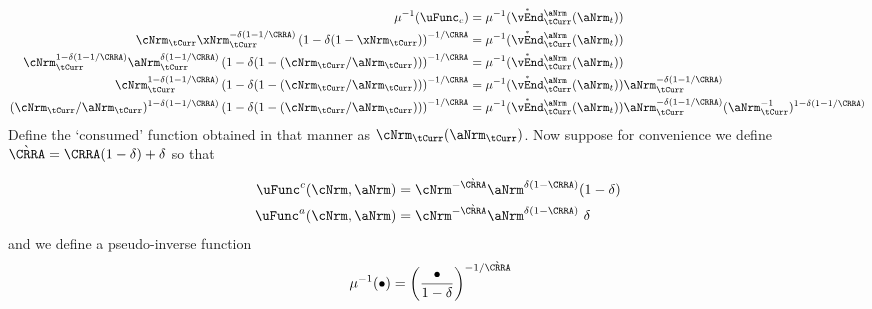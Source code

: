 \documentclass[./SolvingMicroDSOPs]{subfiles}
\begin{document}
{{				\begin{align}
					\muInv(\uFunc_{c}) & = \muInv(\Maxed{\vEnd}^{\aNrm}_{\tCurr}(\aNrm_{t}))
					\\ \cNrm_{\tCurr} \xNrm_{\tCurr}^{-\wealthU(1-1/\CRRA)} \left(1-\wealthU(1-\xNrm_{\tCurr})\right)^{-1/\CRRA} & = \muInv(\Maxed{\vEnd}^{\aNrm}_{\tCurr}(\aNrm_{t})) \notag
					\\ \cNrm_{\tCurr}^{1-\wealthU(1-1/\CRRA)} \aNrm_{\tCurr}^{\wealthU(1-1/\CRRA)} \left(1-\wealthU(1-(\cNrm_{\tCurr}/\aNrm_{\tCurr}))\right)^{-1/\CRRA} & = \muInv(\Maxed{\vEnd}^{\aNrm}_{\tCurr}(\aNrm_{t})) \notag
					\\ \cNrm_{\tCurr}^{1-\wealthU(1-1/\CRRA)}  \left(1-\wealthU(1-(\cNrm_{\tCurr}/\aNrm_{\tCurr}))\right)^{-1/\CRRA} & = \muInv(\Maxed{\vEnd}^{\aNrm}_{\tCurr}(\aNrm_{t})) \aNrm_{\tCurr}^{-\wealthU(1-1/\CRRA)} \notag 
					\\ (\cNrm_{\tCurr}/\aNrm_{\tCurr})^{1-\wealthU(1-1/\CRRA)}  \left(1-\wealthU(1-(\cNrm_{\tCurr}/\aNrm_{\tCurr}))\right)^{-1/\CRRA} & = \muInv(\Maxed{\vEnd}^{\aNrm}_{\tCurr}(\aNrm_{t})) \aNrm_{\tCurr}^{-\wealthU(1-1/\CRRA)}(\aNrm_{\tCurr}^{-1})^{1-\wealthU(1-1/\CRRA)} \notag
					\notag
				\end{align}
				Define the `consumed' function obtained in that manner as $\mathfrak{\cNrm}_{\tCurr}(\aNrm_{\tCurr})$.
			}{}
		} %
		{ %
		}
		Now suppose for convenience we define $\grave{\CRRA}=\CRRA(1-\wealthU)+\wealthU$ so that
		
		\begin{align}
			\uFunc^{c}(\cNrm,\aNrm) & = \cNrm^{-\grave{\CRRA}}\aNrm^{\wealthU(1-\CRRA)}(1- \wealthU)
			\\    \uFunc^{a}(\cNrm,\aNrm) & = \cNrm^{-\grave{\CRRA}}\aNrm^{\wealthU(1-\CRRA)}\phantom{~}\wealthU
		\end{align}
		and we define a pseudo-inverse function
		\begin{align}
			\muInv(\bullet) &= \left(\frac{\bullet}{1-\wealthU}\right)^{-1/\grave{\CRRA}} 
		\end{align}
		
\end{document}
